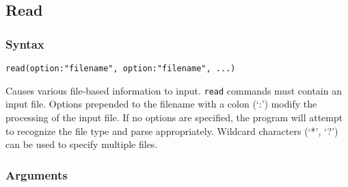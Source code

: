 \subsection{Read}
	\subsubsection{Syntax}
		\texttt{read(option:"filename", option:"filename", ...)}
			
	\begin{phygdescription}
		{Causes various file-based information to input. \texttt{read} commands must contain an input file.
		Options prepended to the filename with a colon (`:') modify the processing of the input file. If no options 
		are specified, the program will attempt to recognize the file type and parse appropriately. Wildcard 
		characters (`*', `?') can be used to specify multiple files.}
	\end{phygdescription}

	\subsubsection{Arguments}
	
